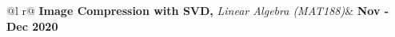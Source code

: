 \begin{tabularx}{\linewidth}{ @{}l r@{} }
\textbf{Image Compression with SVD,} \textit{Linear Algebra (MAT188)}& \hfill \textbf{Nov - Dec 2020 \href{https://www.github.com/destefy/portfolio}{\faLink}} \\[3.75pt]
 \\
\end{tabularx}
\\[10pt]